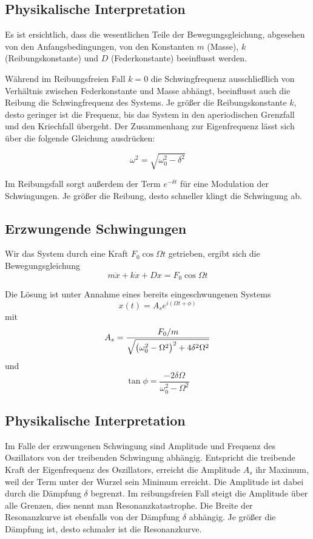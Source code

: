 \documentclass[a4paper,german,12pt,smallheadings]{scrartcl}
\begin{document}
\subsection{Physikalische Interpretation}
Es ist ersichtlich, dass die wesentlichen Teile der Bewegungsgleichung,
abgesehen von den Anfangsbedingungen, von den Konstanten $m$ (Masse), $k$
(Reibungskonstante) und $D$ (Federkonstante) beeinflusst werden.

Während im Reibungsfreien Fall $k=0$ die Schwingfrequenz ausschließlich von
Verhältnis zwischen Federkonstante und Masse abhängt, beeinflusst auch die
Reibung die Schwingfrequenz des Systems. Je größer die Reibungskonstante $k$,
desto geringer ist die Frequenz, bis das System in den aperiodischen Grenzfall
und den Kriechfall übergeht. Der Zusammenhang zur Eigenfrequenz lässt sich über
die folgende Gleichung ausdrücken:

\begin{equation}
  \omega^2 = \sqrt{\omega_0^2 - \delta^2}
  \label{eq:eigenfreq}
\end{equation}

Im Reibungsfall sorgt außerdem der Term $e^{- \delta t}$ für eine Modulation
der Schwingungen. Je größer die Reibung, desto schneller klingt die Schwingung
ab.

\subsection{Erzwungende Schwingungen}
Wir das System durch eine Kraft $F_0 \cos \Omega t$ getrieben, ergibt sich die
Bewegungsgleichung
\begin{equation}
  m \ddot{x} + k \dot{x} + D x = F_0 \cos \Omega t
\end{equation}

Die Lösung ist unter Annahme eines bereits eingeschwungenen Systems
\begin{equation}
  x(t) = A_s e^{i (\Omega t + \phi)}
\end{equation}
mit
\begin{equation}
  A_s = \frac{F_0 / m}{\sqrt{\del{\omega_0^2 - \Omega^2}^2 + 4 \delta^2 \Omega^2}}
  \label{eq:amp}
\end{equation}
und
\begin{equation}
  \tan \phi = \frac{- 2 \delta \Omega}{\omega_0^2 - \Omega^2}
  \label{eq:tan}
\end{equation}

\subsection{Physikalische Interpretation}
Im Falle der erzwungenen Schwingung sind Amplitude und Frequenz des Oszillators
von der treibenden Schwingung abhängig. Entspricht die treibende Kraft der
Eigenfrequenz des Oszillators, erreicht die Amplitude $A_s$ ihr Maximum, weil
der Term unter der Wurzel sein Minimum erreicht. Die Amplitude ist dabei durch
die Dämpfung $\delta$ begrenzt. Im reibungsfreien Fall steigt die Amplitude
über alle Grenzen, dies nennt man Resonanzkatastrophe. Die Breite der
Resonanzkurve ist ebenfalls von der Dämpfung $\delta$ abhängig. Je größer die
Dämpfung ist, desto schmaler ist die Resonanzkurve.
\end{document}
